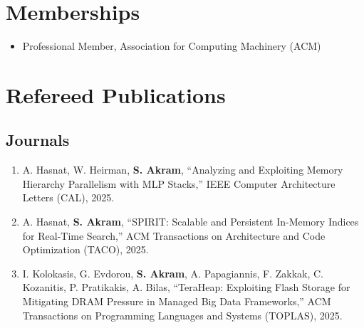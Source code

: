 \documentclass[singlecolumn,singlespace,11pt,a4paper]{article}
\begin{document}
\section*{Memberships}

\begin{itemize}
\item Professional Member, Association for Computing Machinery (ACM)
\end{itemize}

\section*{Refereed Publications}
\subsection*{Journals}
\begin{enumerate}
\item
A. Hasnat, W. Heirman, \textbf{S. Akram}, ``Analyzing and Exploiting Memory Hierarchy Parallelism with MLP Stacks,'' IEEE Computer Architecture Letters (CAL), 2025.
\item
A. Hasnat, \textbf{S. Akram}, ``SPIRIT: Scalable and Persistent In-Memory Indices for Real-Time Search,'' ACM Transactions on Architecture and Code Optimization (TACO), 2025.
\item 
I. Kolokasis, G. Evdorou, \textbf{S. Akram}, A. Papagiannis, F. Zakkak, C. Kozanitis, P. Pratikakis, A. Bilas, ``TeraHeap: Exploiting Flash Storage for Mitigating DRAM Pressure in Managed Big Data Frameworks,'' ACM Transactions on Programming Languages and Systems (TOPLAS), 2025. 


\end{enumerate}
\end{document}
